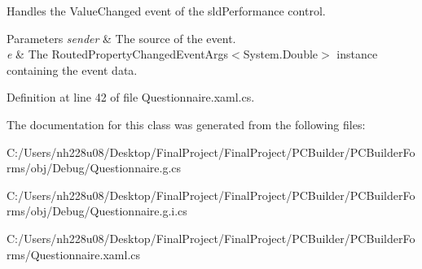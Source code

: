 Handles the Value\+Changed event of the sld\+Performance control. 


\begin{DoxyParams}{Parameters}
{\em sender} & The source of the event.\\
\hline
{\em e} & The Routed\+Property\+Changed\+Event\+Args$<$\+System.\+Double$>$ instance containing the event data.\\
\hline
\end{DoxyParams}


Definition at line 42 of file Questionnaire.\+xaml.\+cs.



The documentation for this class was generated from the following files\+:\begin{DoxyCompactItemize}
\item 
C\+:/\+Users/nh228u08/\+Desktop/\+Final\+Project/\+Final\+Project/\+P\+C\+Builder/\+P\+C\+Builder\+Forms/obj/\+Debug/Questionnaire.\+g.\+cs\item 
C\+:/\+Users/nh228u08/\+Desktop/\+Final\+Project/\+Final\+Project/\+P\+C\+Builder/\+P\+C\+Builder\+Forms/obj/\+Debug/Questionnaire.\+g.\+i.\+cs\item 
C\+:/\+Users/nh228u08/\+Desktop/\+Final\+Project/\+Final\+Project/\+P\+C\+Builder/\+P\+C\+Builder\+Forms/Questionnaire.\+xaml.\+cs\end{DoxyCompactItemize}
